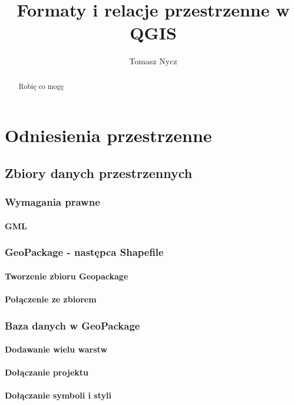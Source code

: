 \documentclass[a4paper,11pt, onecolumn, openany]{memoir}
\author{Tomasz Nycz}
\title{Formaty i relacje przestrzenne w QGIS}
\begin{document}
	
	\frontmatter
	
	\maketitle
	
	\begin{abstract}
		Robię co mogę
	\end{abstract}
	\clearpage
	
	\tableofcontents*
	\clearpage

\part{Odniesienia przestrzenne}
	\chapter{Zbiory danych przestrzennych}
		\section{Wymagania prawne}
			\subsection{GML}
		\section{GeoPackage - następca Shapefile}
			\subsection{Tworzenie zbioru Geopackage}
			\subsection{Połączenie ze zbiorem}
		\section{Baza danych w GeoPackage}
			\subsection{Dodawanie wielu warstw}
			\subsection{Dołączanie projektu}
			\subsection{Dołączanie symboli i styli}		
\end{document}
